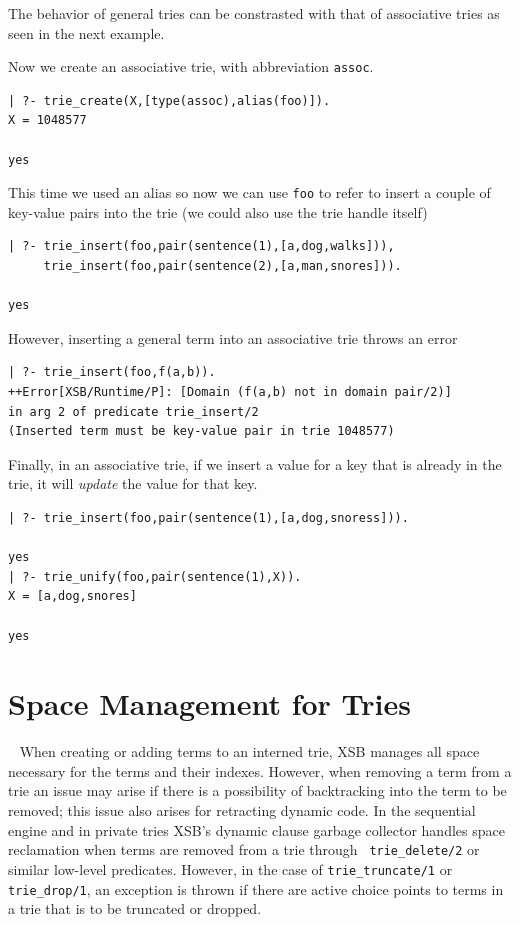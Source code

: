 The behavior of general tries can be constrasted with that of
associative tries as seen in the next example.
\begin{example} \rm
Now we create an associative trie, with abbreviation
{\tt assoc}.
{\small
\begin{verbatim}
| ?- trie_create(X,[type(assoc),alias(foo)]).
X = 1048577

yes
\end{verbatim}
}  \noindent
%
This time we used an alias so now we can use {\tt foo} to refer to
insert a couple of key-value pairs into the trie (we could also use
the trie handle itself) 
{\small
\begin{verbatim}
| ?- trie_insert(foo,pair(sentence(1),[a,dog,walks])), 
     trie_insert(foo,pair(sentence(2),[a,man,snores])).

yes
\end{verbatim}
} \noindent
However, inserting a general term into an associative trie throws an
error
{\small
\begin{verbatim}
| ?- trie_insert(foo,f(a,b)).
++Error[XSB/Runtime/P]: [Domain (f(a,b) not in domain pair/2)]  
in arg 2 of predicate trie_insert/2 
(Inserted term must be key-value pair in trie 1048577)
\end{verbatim}
}  \noindent
Finally, in an associative trie, if we insert a value for a key that
is already in the trie, it will {\em update} the value for that key.
{\small
\begin{verbatim}
| ?- trie_insert(foo,pair(sentence(1),[a,dog,snoress])).

yes
| ?- trie_unify(foo,pair(sentence(1),X)).
X = [a,dog,snores]

yes
\end{verbatim}
}

\end{example}

\section{Space Management for Tries}~\label{sec:trie-gc}
%
When creating or adding terms to an interned trie, XSB manages all
space necessary for the terms and their indexes.  However, when
removing a term from a trie an issue may arise if there is a
possibility of backtracking into the term to be removed; this issue
also arises for retracting dynamic code.  In the sequential engine and
in private tries XSB's dynamic clause garbage collector handles space
reclamation when terms are removed from a trie through {\tt
  trie\_delete/2} or similar low-level predicates.  However, in the
case of {\tt trie\_truncate/1} or {\tt trie\_drop/1}, an exception is
thrown if there are active choice points to terms in a trie that is to
be truncated or dropped.

